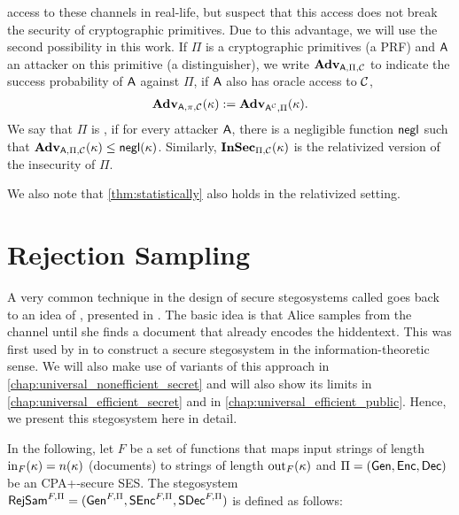 access to these channels in real-life, but suspect that this access does
not break the security of cryptographic primitives. Due to this
advantage, we will use the second possibility in this work. If $\Pi$ is
a cryptographic primitives (\eg a \acl{PRF}) and $\operatorname{\mathsf{A}}$ an attacker on
this primitive (\eg a distinguisher), we write $\operatorname{\mathbf{Adv}}_{\operatorname{\mathsf{A}},\Pi,\mathcal{C}}$
to indicate the success probability of $\operatorname{\mathsf{A}}$ against $\Pi$, if $\operatorname{\mathsf{A}}$
also has oracle access to $\mathcal{C}$, \ie
\begin{align*}
  \operatorname{\mathbf{Adv}}_{\operatorname{\mathsf{A}},\pi,\mathcal{C}}(\kappa) := \operatorname{\mathbf{Adv}}_{\operatorname{\mathsf{A}}^{\mathcal{C}},\Pi}(\kappa).
\end{align*}
We say that $\Pi$ is , if for every
attacker $\operatorname{\mathsf{A}}$, there is a negligible function $\operatorname{\mathsf{negl}}$ such that
$\operatorname{\mathbf{Adv}}_{\operatorname{\mathsf{A}},\Pi,\mathcal{C}}(\kappa) \leq \operatorname{\mathsf{negl}}(\kappa)$.  Similarly,
$\operatorname{\mathbf{InSec}}_{\Pi,\mathcal{C}}(\kappa)$ is the relativized version of the
insecurity of $\Pi$. 

We also note that \autoref{thm:statistically} also holds in the
relativized setting.


\section{Rejection Sampling}
\label{sec:rejsam}
A very common technique in the design of secure stegosystems called
 goes back to an idea of
\citeauthor{anderson1996limits},  presented in
\cite{anderson1996limits}. The basic idea is that Alice samples from the
channel until she finds a document that already encodes the
hiddentext. This was first used by \citeauthor{cachin1998information} in
\cite{cachin1998information} to
construct a secure stegosystem in the information-theoretic sense. We
will also make use of
variants of this approach in
\autoref{chap:universal_nonefficient_secret} and will also show its
limits in \autoref{chap:universal_efficient_secret} and in
\autoref{chap:universal_efficient_public}. Hence, we present this
stegosystem  here in detail. 

In the following, let $F$ be a set of functions that maps input strings
of length $\operatorname{in}_{F}(\kappa) = n(\kappa)$ (\ie documents) to strings of
length $\operatorname{out}_{F}(\kappa)$ and $\Pi=(\operatorname{\mathsf{Gen}},\operatorname{\mathsf{Enc}},\operatorname{\mathsf{Dec}})$ be an
\acs{CPA+}-secure \acf{SES}. The stegosystem
$\operatorname{\mathsf{RejSam}}^{F,\Pi}=(\operatorname{\mathsf{Gen}}^{F,\Pi},\operatorname{\mathsf{SEnc}}^{F,\Pi},\operatorname{\mathsf{SDec}}^{F,\Pi})$ is defined
as follows:


